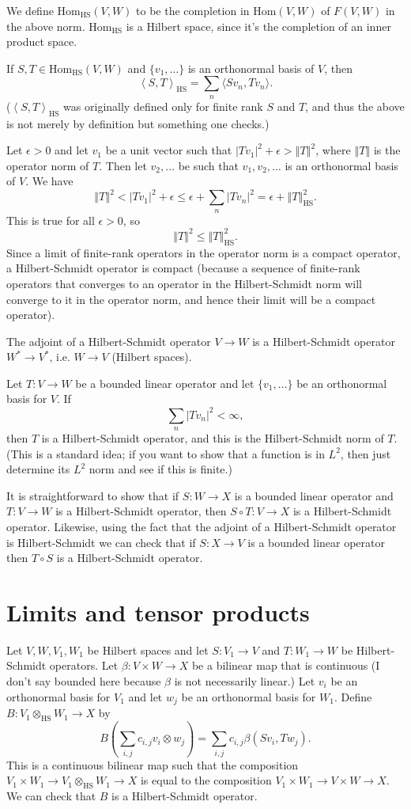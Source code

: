 \documentclass{article}
\newcommand{\HSnorm}[1]{\left\Vert #1 \right\Vert_{\textrm{HS}}}
\newcommand{\HSinner}[2]{\left\langle #1, #2 \right\rangle_{\textrm{HS}}}
\newcommand{\inner}[2]{\langle #1, #2 \rangle}
\newcommand{\HS}{\otimes_{\textrm{HS}}}
\newcommand{\Hom}{\textrm{Hom}}
\newcommand{\norm}[1]{\left\Vert #1 \right\Vert}
\begin{document}
We define $\Hom_{\textrm{HS}}(V,W)$ to be the completion in $\Hom(V,W)$ of $F(V,W)$ in the above norm. $\Hom_{\textrm{HS}}$ is a Hilbert space, since it's the completion of an inner product space. 

If $S,T \in \Hom_{\textrm{HS}}(V,W)$ and $\{v_1,\ldots\}$ is an orthonormal basis of $V$, then
\[
\HSinner{S}{T}=\sum_n \inner{Sv_n}{Tv_n}.
\]
($\HSinner{S}{T}$ was originally defined only for finite rank $S$ and $T$, and thus the above is not merely by definition but something one checks.)

Let $\epsilon>0$ and let $v_1$ be a unit vector such that $|Tv_1|^2+\epsilon>\norm{T}^2$, where $\norm{T}$ is the operator norm of $T$. 
Then let $v_2,\ldots$ be such that $v_1,v_2,\ldots$ is an orthonormal basis of $V$. We have
\[
\norm{T}^2 < |Tv_1|^2 +\epsilon \leq \epsilon+ \sum_n |Tv_n|^2 = \epsilon + \HSnorm{T}^2.
\]
This is true for all $\epsilon>0$, so
\[
\norm{T}^2 \leq  \HSnorm{T}^2.
\]
Since a limit of finite-rank operators in the operator norm is a compact operator, a Hilbert-Schmidt operator is compact (because a sequence of finite-rank
operators that converges to an operator in the Hilbert-Schmidt norm will converge to it in the operator norm, and hence their limit will be a compact operator).

The adjoint of a Hilbert-Schmidt operator $V \to W$ is a Hilbert-Schmidt operator $W^* \to V^*$, i.e. $W \to V$ (Hilbert spaces). 

Let $T:V \to W$ be a bounded linear operator and let $\{v_1,\ldots\}$ be an orthonormal basis for $V$. 
If
\[
\sum_n |Tv_n|^2<\infty,
\]
then $T$ is a Hilbert-Schmidt operator, and this is the Hilbert-Schmidt norm of $T$. (This is a standard idea; if you want to show that a function is in
$L^2$, then just determine its $L^2$ norm and see if this is finite.)

It is straightforward to show that if $S:W \to X$ is a bounded linear operator and $T:V \to W$ is a Hilbert-Schmidt operator, then $S \circ T:V \to X$
is a Hilbert-Schmidt operator. Likewise, using the fact that the adjoint of a Hilbert-Schmidt operator is Hilbert-Schmidt we can check that if
$S:X \to V$ is a bounded linear operator then $T \circ S$ is a Hilbert-Schmidt operator.

\section{Limits and tensor products}
Let $V,W,V_1,W_1$ be Hilbert spaces and let $S:V_1 \to V$ and $T:W_1 \to W$ be Hilbert-Schmidt operators. 
Let $\beta: V \times W \to X$ be a bilinear map that is continuous (I don't say bounded here because $\beta$ is not necessarily linear.)
Let $v_i$ be an orthonormal basis for $V_1$ and let $w_j$ be an orthonormal basis for $W_1$. 
Define $B:V_1 \HS W_1 \to X$ by
\[
B\left( \sum_{i,j} c_{i,j} v_i \otimes w_j \right) = \sum_{i,j} c_{i,j} \beta(Sv_i,Tw_j).
\]
This is a continuous bilinear map such that the composition
$V_1 \times W_1 \to V_1 \HS W_1 \to X$ is equal to the composition $V_1 \times W_1 \to V \times W \to X$.
We can check that $B$ is a Hilbert-Schmidt operator.
\end{document}
